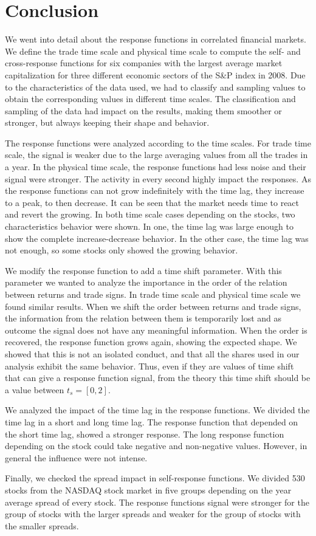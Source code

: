 \section{Conclusion}\label{sec:conclusion}

We went into detail about the response functions in correlated financial
markets. We define the trade time scale and physical time scale to compute the
self- and cross-response functions for six companies with the largest average
market capitalization for three different economic sectors of the S\&P index
in 2008.
Due to the characteristics of the data used, we had to classify and sampling
values to obtain the corresponding values in different time scales.
The classification and sampling of the data had impact on the results, making
them smoother or stronger, but always keeping their shape and behavior.

The response functions were analyzed according to the time scales. For trade
time scale, the signal is weaker due to the large averaging values from all the
trades in a year. In the physical time scale, the response functions had less
noise and their signal were stronger. The activity in every second highly
impact the responses. As the response functions can not grow indefinitely with
the time lag, they increase to a peak, to then decrease. It can be seen that
the market needs time to react and revert the growing. In both time scale cases
depending on the stocks, two characteristics behavior were shown. In one, the
time lag was large enough to show the complete increase-decrease behavior. In
the other case, the time lag was not enough, so some stocks only showed the
growing behavior.

We modify the response function to add a time shift parameter. With this
parameter we wanted to analyze the importance in the order of the relation
between returns and trade signs. In trade time scale and physical time scale we
found similar results. When we shift the order between returns and trade signs,
the information from the relation between them is temporarily lost and as
outcome the signal does not have any meaningful information. When the order is
recovered, the response function grows again, showing the expected shape.
We showed that this is not an isolated conduct, and that all the shares used in
our analysis exhibit the same behavior. Thus, even if they are values of time
shift that can give a response function signal, from the theory this time shift
should be a value between $t_{s} = [0,2]$.

We analyzed the impact of the time lag in the response functions. We divided
the time lag in a short and long time lag. The response function that depended
on the short time lag, showed a stronger response. The long response function
depending on the stock could take negative and non-negative values. However, in
general the influence were not intense.

Finally, we checked the spread impact in self-response functions. We divided
530 stocks from the NASDAQ stock market in five groups depending on the year
average spread of every stock. The response functions signal were stronger for
the group of stocks with the larger spreads and weaker for the group of stocks
with the smaller spreads.
